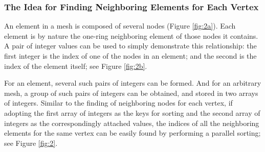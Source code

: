 \documentclass[twocolumn]{svjour3}          \smartqed  \usepackage{graphicx}
\begin{document}
\begin{figure*}[htbp]
	\centering
	\hspace{1em}
	\hspace{1em}
	\hspace{1em}
	\hspace{1em}
	\caption{A simple illustration of finding neighboring nodes for each vertex in a mesh}
	\label{fig:1}       \end{figure*}

\subsubsection{The Idea for Finding Neighboring Elements for Each Vertex}

An element in a mesh is composed of several nodes (Figure \ref{fig:2a}). Each element is by nature 
the one-ring neighboring element of those nodes it contains. A pair of 
integer values can be used to simply demonstrate this relationship: the 
first integer is the index of one of the nodes in an element; and the second 
is the index of the element itself; see Figure \ref{fig:2b}. 

For an element, several such pairs of integers can be formed. And for an 
arbitrary mesh, a group of such pairs of integers can be obtained, and 
stored in two arrays of integers. Similar to the finding of neighboring 
nodes for each vertex, if adopting the first array of integers as the keys 
for sorting and the second array of integers as the correspondingly attached 
values, the indices of all the neighboring elements for the same vertex can 
be easily found by performing a parallel sorting; see Figure \ref{fig:2}.

\begin{figure*}[htbp]
	\centering
	\hspace{1em}
	\hspace{1em}
	\hspace{1em}
	\hspace{1em}
	\caption{A simple illustration of finding neighboring elements for each vertex in a mesh}
	\label{fig:2}       \end{figure*}
\end{document}
